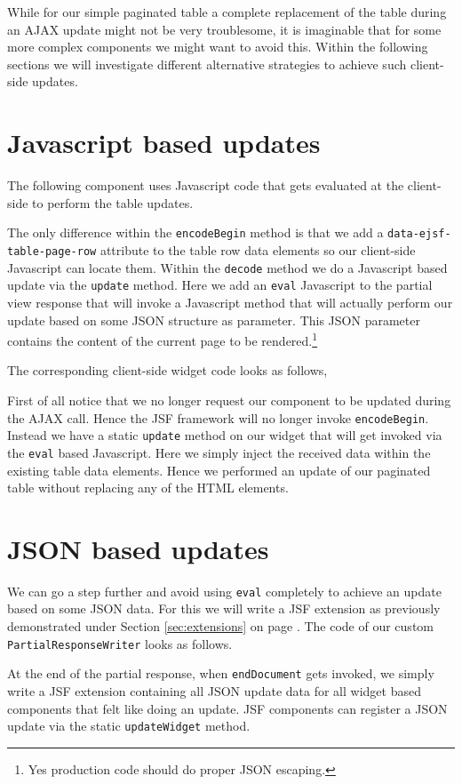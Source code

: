 While for our simple paginated table a complete replacement of the table during an AJAX update might not be very troublesome, it is imaginable that for some more complex components we might want to avoid this.
Within the following sections we will investigate different alternative strategies to achieve such client-side updates.


\section{Javascript based updates}
The following component uses Javascript code that gets evaluated at the client-side to perform the table updates.

The only difference within the \texttt{encodeBegin} method is that we add a \texttt{data-ejsf-table-\allowbreak page-row} attribute to the table row data elements so our client-side Javascript can locate them.
Within the \texttt{decode} method we do a Javascript based update via the \texttt{update} method.
Here we add an \texttt{eval} Javascript to the partial view response that will invoke a Javascript method that will actually perform our update based on some JSON structure as parameter.
This JSON parameter contains the content of the current page to be rendered.\footnote{Yes production code should do proper JSON escaping.}

The corresponding client-side widget code looks as follows,

First of all notice that we no longer request our component to be updated during the AJAX call.
Hence the JSF framework will no longer invoke \texttt{encodeBegin}.
Instead we have a static \texttt{update} method on our widget that will get invoked via the \texttt{eval} based Javascript.
Here we simply inject the received data within the existing table data elements.
Hence we performed an update of our paginated table without replacing any of the HTML elements.

\section{JSON based updates}
We can go a step further and avoid using \texttt{eval} completely to achieve an update based on some JSON data.
For this we will write a JSF extension as previously demonstrated under Section \ref{sec:extensions} on page \pageref{sec:extensions}.
The code of our custom \texttt{PartialResponseWriter} looks as follows.

At the end of the partial response, when \texttt{endDocument} gets invoked, we simply write a JSF extension containing all JSON update data for all widget based components that felt like doing an update.
JSF components can register a JSON update via the static \texttt{updateWidget} method.

